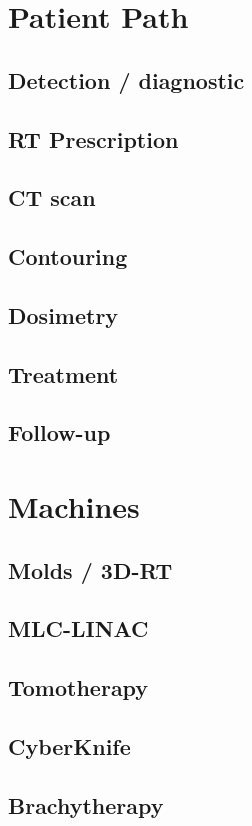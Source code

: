 \section{Patient Path}

\subsection{Detection / diagnostic}
\subsection{RT Prescription}
\subsection{CT scan}
\subsection{Contouring}
\subsection{Dosimetry}
\subsection{Treatment}
\subsection{Follow-up}

\section{Machines}
\subsection{Molds / 3D-RT}
\subsection{MLC-LINAC}
\subsection{Tomotherapy}
\subsection{CyberKnife}
\subsection{Brachytherapy}

